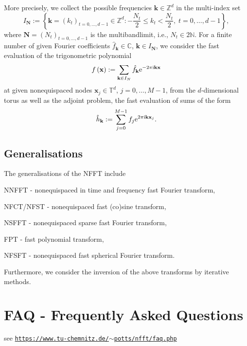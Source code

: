 More precisely, we collect the possible frequencies $\mathbf{k}\in\mathbb{Z}^d$ in the multi-\/index set \[ I_{\mathbf{N}} := \left\{ \mathbf{k}=\left(k_t\right)_{t=0,\dots,d-1} \in \mathbb{Z}^d: - \frac{N_t}{2} \le k_t < \frac{N_t}{2} ,\;t=0,\dots,d-1\right\}, \] where $\mathbf{N}=\left(N_t\right)_{t=0,\dots,d-1}$ is the multibandlimit, i.\-e., $N_t\in 2\mathbb{N}$. For a finite number of given Fourier coefficients $\hat f_{\mathbf{k}} \in \mathbb{C}$, $\mathbf{k}\in I_{\mathbf{N}}$, we consider the fast evaluation of the trigonometric polynomial \[ f\left(\mathbf{x}\right) := \sum_{ \mathbf{k}\in I_{ N}} \hat{f}_{\mathbf{ k}} {\rm e}^{-2\pi{\rm i}\mathbf{k}\mathbf{ x}} \] at given nonequispaced nodes $\mathbf{x}_j \in \mathbb{T}^d$, $j=0,\ldots, M-1$, from the $ d$-\/dimensional torus as well as the adjoint problem, the fast evaluation of sums of the form \[ \hat h_{\mathbf{k}} := \sum_{j=0}^{M-1} {f}_{j} {\rm e}^{2\pi{\rm i}\mathbf{k}\mathbf{ x}_j}. \]\hypertarget{index_generalisations}{}\subsection{Generalisations}\label{index_generalisations}
The generalisations of the N\-F\-F\-T include
\begin{DoxyItemize}
\item N\-N\-F\-F\-T -\/ nonequispaced in time and frequency fast Fourier transform,
\item N\-F\-C\-T/\-N\-F\-S\-T -\/ nonequispaced fast (co)sine transform,
\item N\-S\-F\-F\-T -\/ nonequispaced sparse fast Fourier transform,
\item F\-P\-T -\/ fast polynomial transform,
\item N\-F\-S\-F\-T -\/ nonequispaced fast spherical Fourier transform.
\end{DoxyItemize}

Furthermore, we consider the inversion of the above transforms by iterative methods.\hypertarget{index_faq}{}\section{F\-A\-Q -\/ Frequently Asked Questions}\label{index_faq}
see \href{https://www.tu-chemnitz.de/~potts/nfft/faq.php}{\tt https\-://www.\-tu-\/chemnitz.\-de/$\sim$potts/nfft/faq.\-php} 